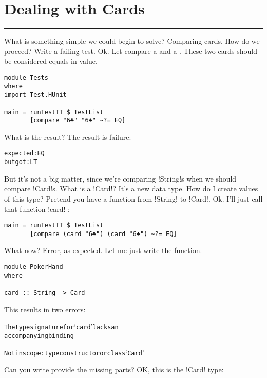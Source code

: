 \newpage
\section{Dealing with Cards} 
\vspace{10cm}
\hrule

\lhQ What is something simple we could begin to solve?
\lhA Comparing cards.
\lhN How do we proceed?
\lhA Write a failing test.
\lhN Ok. Let compare a  and a . These two cards should be considered equals in value.
\begin{lstlisting}[frame=single]
module Tests
where 
import Test.HUnit

main = runTestTT $ TestList 
       [compare "6♣" "6♠" ~?= EQ]
\end{lstlisting} %
What is the result?
\lhA \failure The result is failure: 
\begin{small} 
\begin{alltt}
expected: EQ
 but got: LT
\end{alltt}
\end{small}
But it's not a big matter, since we're comparing \il!String!s when we should compare \il!Card!s.
\lhN What is a \il!Card!?
\lhA It's a new data type.
\lhN How do I create values of this type?
\lhA Pretend you have a function from \il!String! to \il!Card!.
\lhN Ok. I'll just call that function \il!card! :
\begin{lstlisting}[frame=single]
main = runTestTT $ TestList 
       [compare (card "6♣") (card "6♠") ~?= EQ] 
\end{lstlisting} %
What now?
\lhA \error Error, as expected. Let me just write the function.
\begin{lstlisting}[frame=single]
module PokerHand
where

card :: String -> Card
\end{lstlisting}
\lhN \error This results in two errors: 
\begin{small}
\begin{alltt}
The type signature for `card' lacks an 
accompanying binding

Not in scope: type constructor or class `Card'
\end{alltt}
\end{small}
Can you write provide the missing parts?
\lhA \error OK, this is the \il!Card! type:

